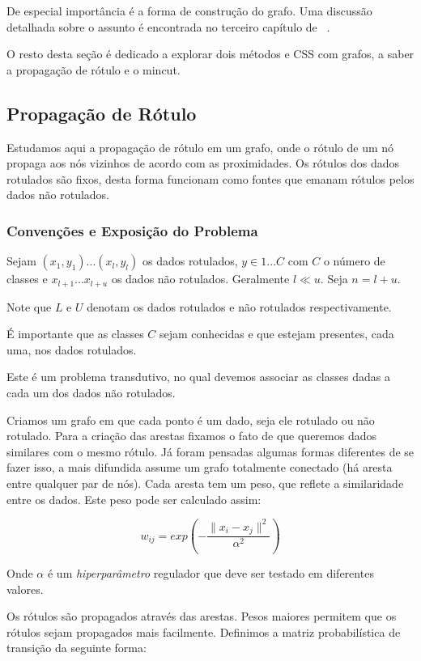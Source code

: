 \documentclass[12pt]{article}
\begin{document}
De especial importância é a forma de construção do grafo. Uma discussão detalhada sobre o assunto é encontrada no terceiro capítulo de ~\cite{zhu1}.

O resto desta seção é dedicado a explorar dois métodos e CSS com grafos, a saber a propagação de rótulo e o mincut.


\subsection{Propagação de Rótulo}
Estudamos aqui a propagação de rótulo em um grafo, onde o rótulo de um nó propaga aos nós vizinhos de acordo com as proximidades. Os rótulos dos dados rotulados são fixos, desta forma funcionam como fontes que emanam rótulos pelos dados não rotulados.

\subsubsection{Convenções e Exposição do Problema}
Sejam ${(x_1,y_1)...(x_l,y_l)}$ os dados rotulados, $y \in {1...C}$ com $C$ o número de classes e ${x_{l+1}...x_{l+u}}$ os dados não rotulados. Geralmente $l \ll u$. Seja $n = l + u$.

Note que $L$ e $U$ denotam os dados rotulados e não rotulados respectivamente.

É importante que as classes $C$ sejam conhecidas e que estejam presentes, cada uma, nos dados rotulados.

Este é um problema transdutivo, no qual devemos associar as classes dadas a cada um dos dados não rotulados. 

Criamos um grafo em que cada ponto é um dado, seja ele rotulado ou não rotulado. Para a criação das arestas fixamos o fato de que queremos dados similares com o mesmo rótulo. Já foram pensadas algumas formas diferentes de se fazer isso, a mais difundida assume um grafo totalmente conectado (há aresta entre qualquer par de nós). Cada aresta tem um peso, que reflete a similaridade entre os dados. Este peso pode ser calculado assim:

\begin{equation} \label{eqod}
        w_{ij} = exp( -\frac{\| x_i - x_j \|^2}{\alpha^2} )
\end{equation}

Onde $\alpha$ é um \emph{hiperparâmetro} regulador que deve ser testado em diferentes valores.

Os rótulos são propagados através das arestas. Pesos maiores permitem que os rótulos sejam propagados mais facilmente. Definimos a matriz probabilística de transição da seguinte forma:
\end{document}

